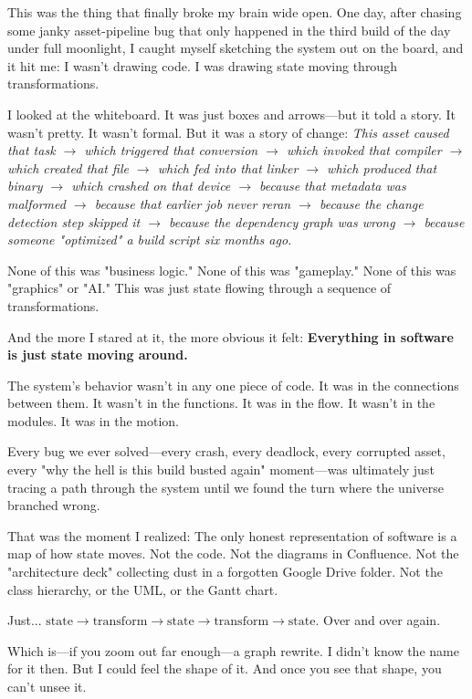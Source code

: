 This was the thing that finally broke my brain wide open. One day, after chasing some janky asset-pipeline bug that only happened in the third build of the day under full moonlight, I caught myself sketching the system out on the board, and it hit me: I wasn't drawing code. I was drawing state moving through transformations.

I looked at the whiteboard. It was just boxes and arrows—but it told a story. It wasn't pretty. It wasn't formal. But it was a story of change: \textit{This asset caused that task $\rightarrow$ which triggered that conversion $\rightarrow$ which invoked that compiler $\rightarrow$ which created that file $\rightarrow$ which fed into that linker $\rightarrow$ which produced that binary $\rightarrow$ which crashed on that device $\rightarrow$ because that metadata was malformed $\rightarrow$ because that earlier job never reran $\rightarrow$ because the change detection step skipped it $\rightarrow$ because the dependency graph was wrong $\rightarrow$ because someone "optimized" a build script six months ago.}

None of this was "business logic." None of this was "gameplay." None of this was "graphics" or "AI." This was just state flowing through a sequence of transformations.

And the more I stared at it, the more obvious it felt: \textbf{Everything in software is just state moving around.}

The system's behavior wasn't in any one piece of code. It was in the connections between them. It wasn't in the functions. It was in the flow. It wasn't in the modules. It was in the motion.

Every bug we ever solved—every crash, every deadlock, every corrupted asset, every "why the hell is this build busted again" moment—was ultimately just tracing a path through the system until we found the turn where the universe branched wrong.

That was the moment I realized: The only honest representation of software is a map of how state moves. Not the code. Not the diagrams in Confluence. Not the "architecture deck" collecting dust in a forgotten Google Drive folder. Not the class hierarchy, or the UML, or the Gantt chart.

Just... $\text{state} \rightarrow \text{transform} \rightarrow \text{state} \rightarrow \text{transform} \rightarrow \text{state}$. Over and over again.

Which is—if you zoom out far enough—a graph rewrite. I didn't know the name for it then. But I could feel the shape of it. And once you see that shape, you can't unsee it.

